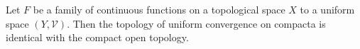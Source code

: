 Let $F$ be a family of continuous functions on a topological space $X$ to a uniform space $(Y, \mathcal{V})$. Then the topology of uniform convergence on compacta is identical with the compact open topology.
